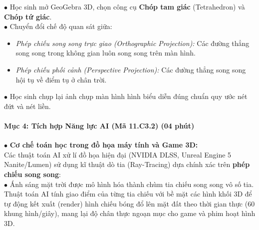 \documentclass[12pt, a4paper]{article}
\begin{document}
\begin{pedabox}
    $\bullet$ Học sinh mở GeoGebra 3D, chọn công cụ \textbf{Chóp tam giác} (Tetrahedron) và \textbf{Chóp tứ giác}.\\
    $\bullet$ Chuyển đổi chế độ quan sát giữa:
    \begin{itemize}
        \item \textit{Phép chiếu song song trực giao (Orthographic Projection):} Các đường thẳng song song trong không gian luôn song song trên màn hình.
        \item \textit{Phép chiếu phối cảnh (Perspective Projection):} Các đường thẳng song song hội tụ về điểm tụ ở chân trời.
    \end{itemize}
    $\bullet$ Học sinh chụp lại ảnh chụp màn hình hình biểu diễn đúng chuẩn quy ước nét đứt và nét liền.
\end{pedabox}

\paragraph{Mục 4: Tích hợp Năng lực AI (Mã 11.C3.2) (04 phút)}

\begin{aibox}
    $\bullet$ \textbf{Cơ chế toán học trong đồ họa máy tính và Game 3D:}\\
    Các thuật toán AI xử lí đồ họa hiện đại (NVIDIA DLSS, Unreal Engine 5 Nanite/Lumen) sử dụng kĩ thuật dò tia (Ray-Tracing) dựa chính xác trên \textbf{phép chiếu song song}:\\
    $\bullet$ Ánh sáng mặt trời được mô hình hóa thành chùm tia chiếu song song vô số tia. Thuật toán AI tính giao điểm của từng tia chiếu với bề mặt các hình khối 3D để tự động kết xuất (render) hình chiếu bóng đổ lên mặt đất theo thời gian thực (60 khung hình/giây), mang lại độ chân thực ngoạn mục cho game và phim hoạt hình 3D.
\end{aibox}
\end{document}
